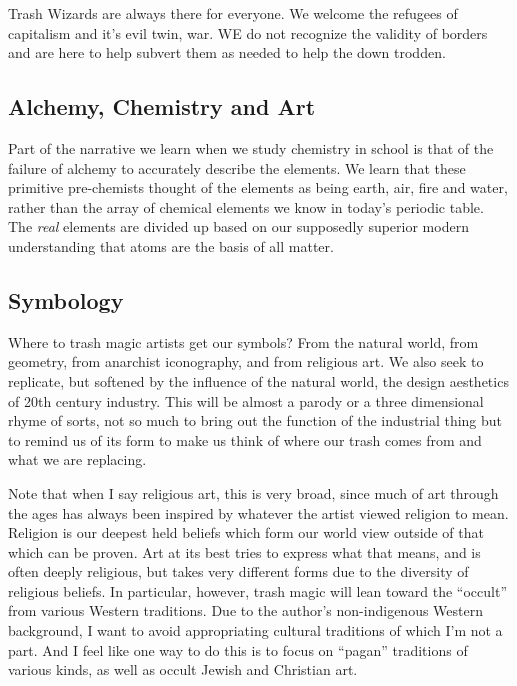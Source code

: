 Trash Wizards are always there for everyone. We welcome the refugees of
capitalism and it's evil twin, war. WE do not recognize the validity of
borders and are here to help subvert them as needed to help the down
trodden.

\subsection{Alchemy, Chemistry and Art}\label{alchemy-chemistry-and-art}

Part of the narrative we learn when we study chemistry in school is that
of the failure of alchemy to accurately describe the elements. We learn
that these primitive pre-chemists thought of the elements as being
earth, air, fire and water, rather than the array of chemical elements
we know in today's periodic table. The \emph{real} elements are divided
up based on our supposedly superior modern understanding that atoms are
the basis of all matter.

\subsection{Symbology}\label{symbology}

Where to trash magic artists get our symbols? From the natural world,
from geometry, from anarchist iconography, and from religious art. We
also seek to replicate, but softened by the influence of the natural
world, the design aesthetics of 20th century industry. This will be
almost a parody or a three dimensional rhyme of sorts, not so much to
bring out the function of the industrial thing but to remind us of its
form to make us think of where our trash comes from and what we are
replacing.

Note that when I say religious art, this is very broad, since much of
art through the ages has always been inspired by whatever the artist
viewed religion to mean. Religion is our deepest held beliefs which form
our world view outside of that which can be proven. Art at its best
tries to express what that means, and is often deeply religious, but
takes very different forms due to the diversity of religious beliefs. In
particular, however, trash magic will lean toward the ``occult'' from
various Western traditions. Due to the author's non-indigenous Western
background, I want to avoid appropriating cultural traditions of which
I'm not a part. And I feel like one way to do this is to focus on
``pagan'' traditions of various kinds, as well as occult Jewish and
Christian art.


